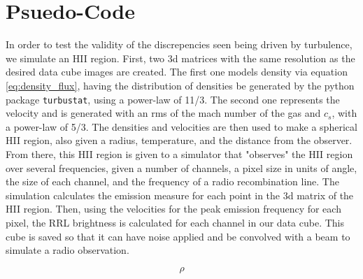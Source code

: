 \documentclass{article}
\def\code#1{\texttt{#1}}
\begin{document}
\section{Psuedo-Code}
In order to test the validity of the discrepencies seen being driven by turbulence, we simulate an HII region. First, two 3d matrices with the same resolution as the desired data cube images are created. The first one models density via equation \ref{eq:density_flux}, having the distribution of densities be generated by the python package \code{turbustat}, using a power-law of 11/3. The second one represents the velocity and is generated with an rms of the mach number of the gas and $c_s$, with a power-law of 5/3. The densities and velocities are then used to make a spherical HII region, also given a radius, temperature, and the distance from the observer. From there, this HII region is given to a simulator that "observes" the HII region over several frequencies, given a number of channels, a pixel size in units of angle, the size of each channel, and the frequency of a radio recombination line. The simulation calculates the emission measure for each point in the 3d matrix of the HII region. Then, using the velocities for the peak emission frequency for each pixel, the RRL brightness is calculated for each channel in our data cube. This cube is saved so that it can have noise applied and be convolved with a beam to simulate a radio observation.

\begin{equation}
  \rho
  \label{eq:density_flux}
\end{equation}
\end{document}
